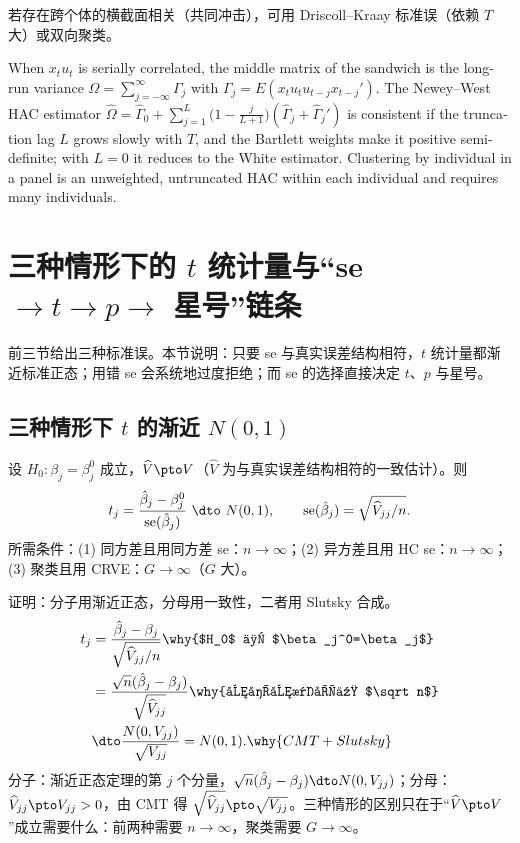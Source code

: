 若存在跨个体的横截面相关（共同冲击），可用 Driscoll--Kraay 标准误（依赖 $T$ 大）或双向聚类。

\begin{english}
When $x_tu_t$ is serially correlated, the middle matrix of the sandwich is the long-run variance $\Omega=\sum_{j=-\infty}^{\infty}\Gamma_j$ with $\Gamma_j=E(x_tu_tu_{t-j}x_{t-j}')$. The Newey--West HAC estimator $\hat\Omega=\hat\Gamma_0+\sum_{j=1}^L\bigl(1-\frac{j}{L+1}\bigr)(\hat\Gamma_j+\hat\Gamma_j')$ is consistent if the truncation lag $L$ grows slowly with $T$, and the Bartlett weights make it positive semi-definite; with $L=0$ it reduces to the White estimator. Clustering by individual in a panel is an unweighted, untruncated HAC within each individual and requires many individuals.
\end{english}

\section{三种情形下的 \texorpdfstring{$t$}{t} 统计量与“se \texorpdfstring{$\to t\to p\to$}{-> t -> p ->} 星号”链条}\label{sec:U05b-t}

前三节给出三种标准误。本节说明：只要 se 与真实误差结构相符，$t$ 统计量都渐近标准正态；用错 se 会系统地过度拒绝；而 se 的选择直接决定 $t$、$p$ 与星号。

\subsection{三种情形下 \texorpdfstring{$t$}{t} 的渐近 \texorpdfstring{$N(0,1)$}{N(0,1)}}

\begin{thm}[$t$ 统计量的渐近分布]\label{thm:U05b-t}
设 $H_0:\beta_j=\beta_j^0$ 成立，$\widehat V\pto V$（$\widehat V$ 为与真实误差结构相符的一致估计）。则
\[
t_j=\frac{\hat\beta_j-\beta_j^0}{\operatorname{se}(\hat\beta_j)}\ \dto\ N(0,1),\qquad\operatorname{se}(\hat\beta_j)=\sqrt{\widehat V_{jj}/n}.
\]
所需条件：(1) 同方差且用同方差 se：$n\to\infty$；(2) 异方差且用 HC se：$n\to\infty$；(3) 聚类且用 CRVE：$G\to\infty$（$G$ 大）。
\end{thm}

证明：分子用渐近正态，分母用一致性，二者用 Slutsky 合成。
\begin{align*}
t_j&=\frac{\hat\beta_j-\beta_j}{\sqrt{\widehat V_{jj}/n}} \why{$H_0$ 下 $\beta_j^0=\beta_j$}\\
&=\frac{\sqrt n(\hat\beta_j-\beta_j)}{\sqrt{\widehat V_{jj}}} \why{分子分母同乘 $\sqrt n$}\\
&\dto\frac{N(0,V_{jj})}{\sqrt{V_{jj}}}=N(0,1). \why{CMT + Slutsky}
\end{align*}
分子：渐近正态定理的第 $j$ 个分量，$\sqrt n(\hat\beta_j-\beta_j)\dto N(0,V_{jj})$；分母：$\widehat V_{jj}\pto V_{jj}>0$，由 CMT 得 $\sqrt{\widehat V_{jj}}\pto\sqrt{V_{jj}}$。三种情形的区别只在于“$\widehat V\pto V$”成立需要什么：前两种需要 $n\to\infty$，聚类需要 $G\to\infty$。

